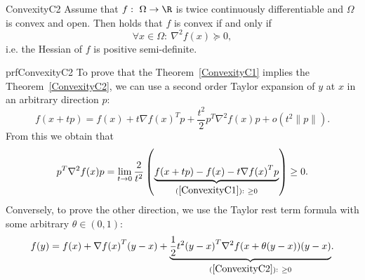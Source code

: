 \begin{theo}{ConvexityC2}
    Assume that $f: \ \Omega \rightarrow \R$ is twice continuously differentiable and $\Omega$ is convex and open. Then holds that $f$ is convex if and only if
    \begin{equation*}
        \forall x \in \Omega: \ \nabla^2 f(x) \succeq 0,
    \end{equation*}
    i\@.e\@. the Hessian of $f$ is positive semi-definite.
\end{theo}

\begin{prf}{prfConvexityC2}
    To prove that the Theorem~\ref{ConvexityC1} implies the Theorem~\ref{ConvexityC2}, we can use a second order Taylor expansion of $y$ at $x$ in an arbitrary direction $p$:
    \begin{equation*}
        f(x + tp) = f(x) + t \nabla {f(x)}^T p + \frac{t^2}{2} p^T \nabla^2 f(x) p + o(t^2\|p\|).
    \end{equation*}
    From this we obtain that
    \begin{equation*}
        p^T \nabla^2 f(x) p = \lim_{t \rightarrow 0} \frac{2}{t^2} \left(\underset{(\ref*{ConvexityC1}): \ \geq 0}{\underbrace{f(x + tp) - f(x) - t \nabla {f(x)}^T p}}\right) \geq 0.
    \end{equation*}
    Conversely, to prove the other direction, we use the Taylor rest term formula with some arbitrary $\theta \in (0,1)$:
    \begin{equation*}
        f(y) = f(x) + \nabla {f(x)}^T(y-x) + \underset{(\ref*{ConvexityC2}): \ \geq 0}{\underbrace{\frac{1}{2}t^2 {(y-x)}^T \nabla^2 f(x + \theta(y-x)) (y-x)}}. 
    \end{equation*}
    \vspace{-0.7cm}
\end{prf}

